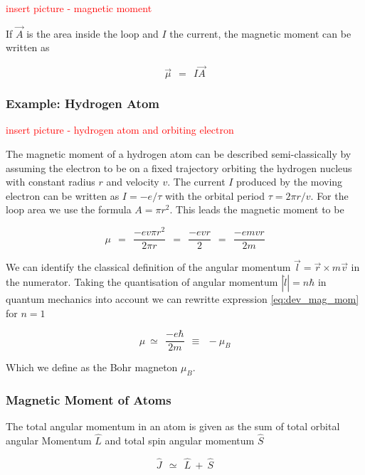 \documentclass[10pt]{report}
\numberwithin{equation}{chapter}
\begin{document}
\textcolor{red}{insert picture - magnetic moment}

If $\vec{A}$ is the area inside the loop and $I$ the current, the magnetic moment can be written as

\begin{equation} \label{eq:mag_mom}
  \vec{\mu} ~~=~~ I \vec{A}
\end{equation}


\subsubsection{Example: Hydrogen Atom}

\textcolor{red}{insert picture - hydrogen atom and orbiting electron}

The magnetic moment of a hydrogen atom can be described semi-classically by assuming the electron to be on a fixed trajectory orbiting the hydrogen nucleus with constant radius $r$ and velocity $v$. The current $I$ produced by the moving electron can be written as $I = -e/\tau$ with the orbital period $\tau = 2\pi r/v$. For the loop area we use the formula $A= \pi r^2$. This leads the magnetic moment to be

\begin{equation} \label{eq:dev_mag_mom}
  \mu ~~=~~ \frac{-e v \pi r^2}{2 \pi r} ~~=~~ \frac{-evr}{2} ~~=~~ \frac{-e m v r}{2m}
\end{equation}

We can identify the classical definition of the angular momentum  $\vec{l} = \vec{r} \times m \vec{v}$ in the numerator. Taking the quantisation of angular momentum $|\hat{l}| = n \hbar$ in quantum mechanics into account we can rewritte expression \ref{eq:dev_mag_mom} for $n=1$

\begin{equation} \label{eq:bohr_mag}
  \mu ~≃ ~~ \frac{-e \hbar}{2m} ~~ \equiv ~~ -\mu_B
\end{equation}

Which we define as the Bohr magneton $\mu_B$.


\subsubsection{Magnetic Moment of Atoms}

The total angular momentum in an atom is given as the sum of total orbital angular Momentum $\hat{L}$  and total spin angular momentum $\hat{S}$

\begin{equation}
  \hat{J} ~~≃~~ \hat{L} ~+~ \hat{S}
\end{equation}
\end{document}
